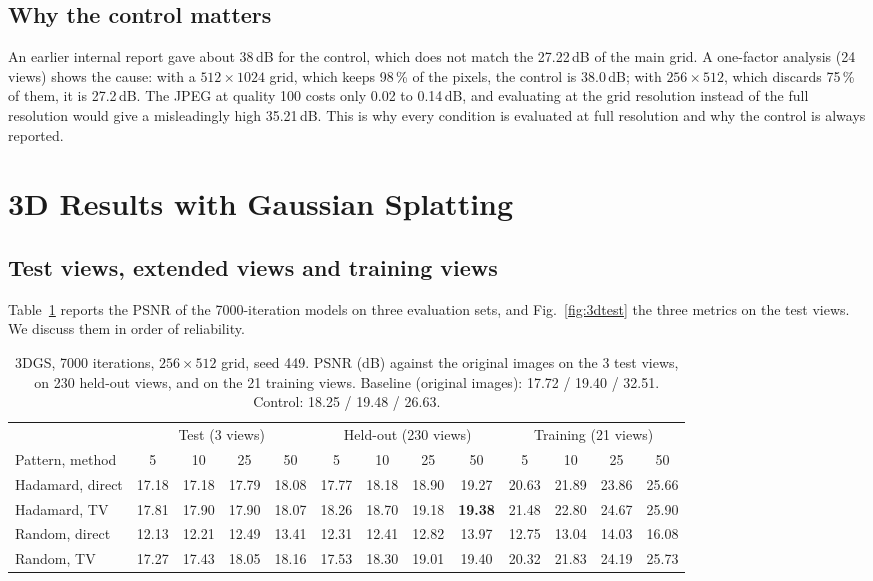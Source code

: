 \documentclass[conference]{IEEEtran}
\begin{document}
\subsection{Why the control matters}
An earlier internal report gave about 38\,dB for the control, which does not match the 27.22\,dB of the main grid. A one-factor
analysis (24 views) shows the cause: with a $512\times1024$ grid, which keeps 98\,\% of the pixels, the control is 38.0\,dB;
with $256\times512$, which discards 75\,\% of them, it is 27.2\,dB. The JPEG at quality 100 costs only 0.02 to 0.14\,dB, and
evaluating at the grid resolution instead of the full resolution would give a misleadingly high 35.21\,dB. This is why every
condition is evaluated at full resolution and why the control is always reported.

\section{3D Results with Gaussian Splatting}
\label{sec:3d}
\subsection{Test views, extended views and training views}
Table~\ref{tab:3d} reports the PSNR of the 7000-iteration models on three evaluation sets, and Fig.~\ref{fig:3dtest} the
three metrics on the test views. We discuss them in order of reliability.

\begin{table}[t]
\caption{3DGS, 7000 iterations, $256\times512$ grid, seed 449. PSNR (dB) against the original images on the 3 test views, on
230 held-out views, and on the 21 training views. Baseline (original images): 17.72 / 19.40 / 32.51. Control: 18.25 / 19.48 / 26.63.}
\label{tab:3d}
\centering
\footnotesize
\setlength{\tabcolsep}{3.5pt}
\begin{tabular}{lcccc|cccc|cccc}
\toprule
 & \multicolumn{4}{c|}{Test (3 views)} & \multicolumn{4}{c|}{Held-out (230 views)} & \multicolumn{4}{c}{Training (21 views)}\\
Pattern, method & 5 & 10 & 25 & 50 & 5 & 10 & 25 & 50 & 5 & 10 & 25 & 50 \\
\midrule
Hadamard, direct & 17.18 & 17.18 & 17.79 & 18.08 & 17.77 & 18.18 & 18.90 & 19.27 & 20.63 & 21.89 & 23.86 & 25.66 \\
Hadamard, TV & 17.81 & 17.90 & 17.90 & 18.07 & 18.26 & 18.70 & 19.18 & \textbf{19.38} & 21.48 & 22.80 & 24.67 & 25.90 \\
Random, direct & 12.13 & 12.21 & 12.49 & 13.41 & 12.31 & 12.41 & 12.82 & 13.97 & 12.75 & 13.04 & 14.03 & 16.08 \\
Random, TV & 17.27 & 17.43 & 18.05 & 18.16 & 17.53 & 18.30 & 19.01 & 19.40 & 20.32 & 21.83 & 24.19 & 25.73 \\
\bottomrule
\end{tabular}
\end{table}
\end{document}
